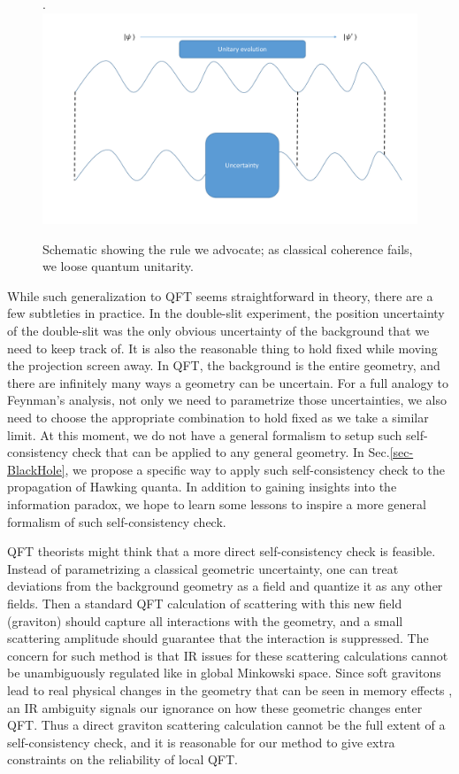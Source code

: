 \documentclass[aps,showpacs,onecolumn,floats,prd,superscriptaddress,nofootinbib]{revtex4-1}
\begin{document}
\begin{figure}[tb]
\begin{center}.
\includegraphics[scale = 0.5]{bh_coherence.pdf}
\caption{Schematic showing the rule we advocate; as classical coherence fails, we loose quantum unitarity.}
\label{fig-QFT}
\end{center}
\end{figure}

While such generalization to QFT seems straightforward in theory, there are a few subtleties in practice.
In the double-slit experiment, the position uncertainty of the double-slit was the only obvious uncertainty of the background that we need to keep track of.
It is also the reasonable thing to hold fixed while moving the projection screen away.
In QFT, the background is the entire geometry, and there are infinitely many ways a geometry can be uncertain.
For a full analogy to Feynman's analysis, not only we need to parametrize those uncertainties, we also need to choose the appropriate combination to hold fixed as we take a similar limit.
At this moment, we do not have a general formalism to setup such self-consistency check that can be applied to any general geometry. 
In Sec.\ref{sec-BlackHole}, we propose a specific way to apply such self-consistency check to the propagation of Hawking quanta.
In addition to gaining insights into the information paradox, we hope to learn some lessons to inspire a more general formalism of such self-consistency check.

QFT theorists might think that a more direct self-consistency check is feasible.
Instead of parametrizing a classical geometric uncertainty, one can treat deviations from the background geometry as a field and quantize it as any other fields.
Then a standard QFT calculation of scattering with this new field (graviton) should capture all interactions with the geometry, and a small scattering amplitude should guarantee that the interaction is suppressed. 
The concern for such method is that IR issues for these scattering calculations cannot be unambiguously regulated like in global Minkowski space.
Since soft gravitons lead to real physical changes in the geometry that can be seen in memory effects \cite{Wei65,HeLys14}, an IR ambiguity signals our ignorance on how these geometric changes enter QFT.
Thus a direct graviton scattering calculation cannot be the full extent of a self-consistency check, and it is reasonable for our method to give extra constraints on the reliability of local QFT.
\end{document}
